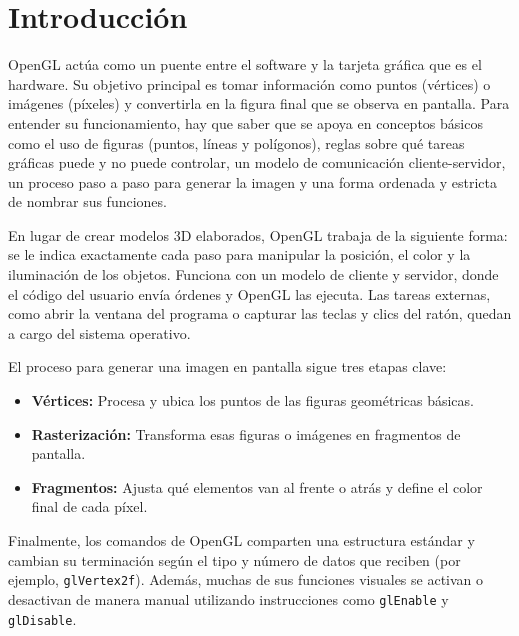 \section{Introducción}

OpenGL actúa como un puente entre el software y la tarjeta gráfica que es el hardware. Su objetivo principal es tomar información como puntos (vértices) o imágenes (píxeles) y convertirla en la figura final que se observa en pantalla. Para entender su funcionamiento, hay que saber que se apoya en conceptos básicos como el uso de figuras (puntos, líneas y polígonos), reglas sobre qué tareas gráficas puede y no puede controlar, un modelo de comunicación cliente-servidor, un proceso paso a paso para generar la imagen y una forma ordenada y estricta de nombrar sus funciones.

En lugar de crear modelos 3D elaborados, OpenGL trabaja de la siguiente forma: se le indica exactamente cada paso para manipular la posición, el color y la iluminación de los objetos. Funciona con un modelo de cliente y servidor, donde el código del usuario envía órdenes y OpenGL las ejecuta. Las tareas externas, como abrir la ventana del programa o capturar las teclas y clics del ratón, quedan a cargo del sistema operativo.

El proceso para generar una imagen en pantalla sigue tres etapas clave:
\begin{itemize}
    \item \textbf{Vértices:} Procesa y ubica los puntos de las figuras geométricas básicas.
    \item \textbf{Rasterización:} Transforma esas figuras o imágenes en fragmentos de pantalla.
    \item \textbf{Fragmentos:} Ajusta qué elementos van al frente o atrás y define el color final de cada píxel.
\end{itemize}

Finalmente, los comandos de OpenGL comparten una estructura estándar y cambian su terminación según el tipo y número de datos que reciben (por ejemplo, \texttt{glVertex2f}). Además, muchas de sus funciones visuales se activan o desactivan de manera manual utilizando instrucciones como \texttt{glEnable} y \texttt{glDisable}.